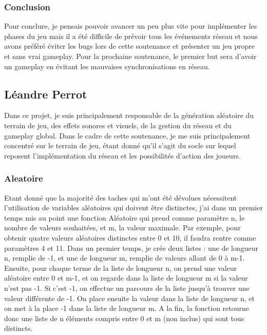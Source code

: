 \documentclass{article}
\begin{document}
\subsubsection{Conclusion}

Pour conclure, je pensais pouvoir avancer un peu plus vite pour implémenter les phases du jeu mais il a été difficile de prévoir tous les événements réseau et nous avons préféré éviter les bugs lors de cette soutenance et présenter un jeu propre et sans vrai gameplay.
Pour la prochaine soutenance, le premier but sera d'avoir un gameplay en évitant les mauvaises synchronisations en réseau.


\newpage
\subsection{Léandre Perrot}
Dans ce projet, je suis principalement responsable de la génération aléatoire du terrain de jeu, des effets sonores et visuels, de la gestion du réseau et du gameplay global. Dans le cadre de cette soutenance, je me suis principalement concentré sur le terrain de jeu, étant donné qu'il s'agit du socle sur lequel reposent l'implémentation du réseau et les possibilités d'action des joueurs.

\subsubsection{Aleatoire}
Etant donné que la majorité des taches qui m'ont été dévolues nécessitent l'utilisation de variables aléatoires qui doivent être distinctes, j'ai dans un premier temps mis au point une fonction Aléatoire qui prend comme paramètre n, le nombre de valeurs souhaitées, et m, la valeur maximale. Par exemple, pour obtenir quatre valeurs aléatoires distinctes entre 0 et 10, il faudra rentre comme paramètres 4 et 11. Dans un premier temps, je crée deux listes : une de longueur n, remplie de -1, et une de longueur m, remplie de valeurs allant de 0 à m-1. Ensuite, pour chaque terme de la liste de longueur n, on prend une valeur aléatoire entre 0 et m-1, et on regarde dans la liste de longueur m si la valeur n'est pas -1. Si c'est -1, on effectue un parcours de la liste jusqu'à trouver une valeur différente de -1. On place ensuite la valeur dans la liste de longueur n, et on met à la place -1 dans la liste de longueur m. A la fin, la fonction retourne donc une liste de n éléments compris entre 0 et m (non inclus) qui sont tous distincts.
\end{document}
